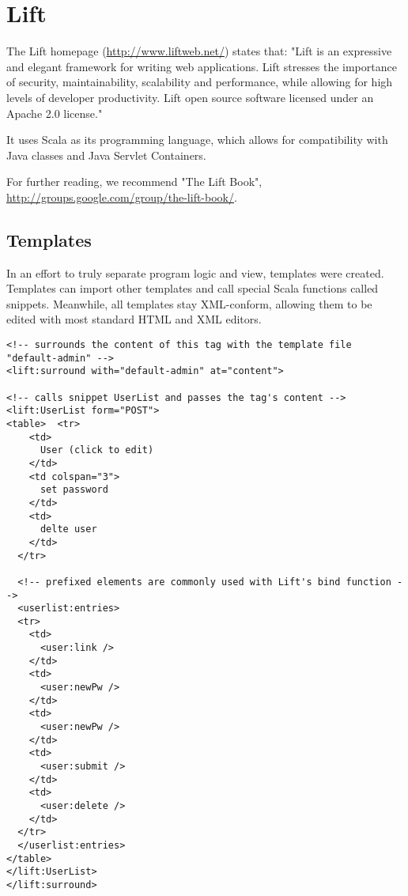 \section{Lift}

The Lift homepage (\url{http://www.liftweb.net/}) states that:
"Lift is an expressive and elegant framework for writing web applications. Lift stresses the importance of security, maintainability, scalability and performance, while allowing for high levels of developer productivity. Lift open source software licensed under an Apache 2.0 license."

It uses Scala as its programming language, which allows for compatibility with Java classes and Java Servlet Containers.

For further reading, we recommend "The Lift Book", \url{http://groups.google.com/group/the-lift-book/}.


\subsection{Templates}

In an effort to truly separate program logic and view, templates were created. Templates can import other templates and call special Scala functions called snippets. Meanwhile, all templates stay XML-conform, allowing them to be edited with most standard HTML and XML editors.

\begin{lstlisting}[caption=Lift Templates: userlist.html,label=lst:lift:templates]
<!-- surrounds the content of this tag with the template file "default-admin" -->
<lift:surround with="default-admin" at="content">

<!-- calls snippet UserList and passes the tag's content -->
<lift:UserList form="POST">
<table>  <tr>
    <td>
      User (click to edit)
    </td>
    <td colspan="3">
      set password
    </td>
    <td>
      delte user
    </td>
  </tr>
  
  <!-- prefixed elements are commonly used with Lift's bind function -->
  <userlist:entries>
  <tr>
    <td>
      <user:link />
    </td>
    <td>
      <user:newPw />
    </td>
    <td>
      <user:newPw />
    </td>
    <td>
      <user:submit />
    </td>
    <td>
      <user:delete />
    </td>
  </tr>
  </userlist:entries>
</table>
</lift:UserList>
</lift:surround>
\end{lstlisting}


